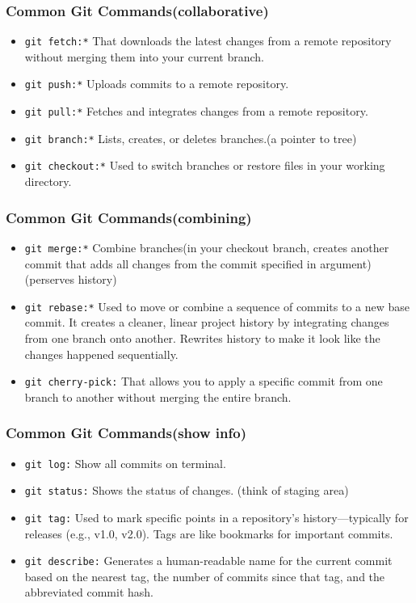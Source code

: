 \documentclass{beamer}
\begin{document}
\begin{frame}\frametitle{Common Git Commands(collaborative)}
\begin{itemize}
\item \texttt{git fetch:*} That downloads the latest changes from a remote repository without merging them into your current branch.
\item \texttt{git push:*} Uploads commits to a remote repository.
\item \texttt{git pull:*} Fetches and integrates changes from a remote repository.
\item \texttt{git branch:*} Lists, creates, or deletes branches.(a pointer to tree) 
\item \texttt{git checkout:*} Used to switch branches or restore files in your working directory.
\end{itemize}
\end{frame}

    
\begin{frame}\frametitle{Common Git Commands(combining)}
\begin{itemize}
\item \texttt{git merge:*} Combine branches(in your checkout branch, creates another commit that adds all changes from the commit specified in argument)(perserves history)
\item \texttt{git rebase:*} Used to move or combine a sequence of commits to a new base commit. It creates a cleaner, linear project history by integrating changes from one branch onto another. Rewrites history to make it look like the changes happened sequentially.
\item \texttt{git cherry-pick:} That allows you to apply a specific commit from one branch to another without merging the entire branch. 
\end{itemize}
\end{frame}


\begin{frame}\frametitle{Common Git Commands(show info)}
\begin{itemize}
\item \texttt{git log:} Show all commits on terminal.
\item \texttt{git status:} Shows the status of changes. (think of staging area)
\item \texttt{git tag:} Used to mark specific points in a repository's history—typically for releases (e.g., v1.0, v2.0). Tags are like bookmarks for important commits.
\item \texttt{git describe:} Generates a human-readable name for the current commit based on the nearest tag, the number of commits since that tag, and the abbreviated commit hash.
\end{itemize}
\end{frame}
\end{document}
